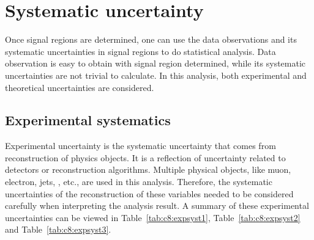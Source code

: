 \chapter{Systematic uncertainty}
\label{ch:sys-unc}

\par Once signal regions are determined, one can use the data observations and its systematic uncertainties in signal regions to do statistical analysis. Data observation is easy to obtain with signal region determined, while its systematic uncertainties are not trivial to calculate. In this analysis, both experimental and theoretical uncertainties are considered.

\section{Experimental systematics}

\par Experimental uncertainty is the systematic uncertainty that comes from reconstruction of physics objects. It is a reflection of uncertainty related to detectors or reconstruction algorithms. Multiple physical objects, like muon, electron, jets, \met, etc., are used in this analysis. Therefore, the systematic uncertainties of the reconstruction of these variables needed to be considered carefully when interpreting the analysis result. A summary of these experimental uncertainties can be viewed in Table~\ref{tab:c8:expsyst1}, Table~\ref{tab:c8:expsyst2} and Table~\ref{tab:c8:expsyst3}.

